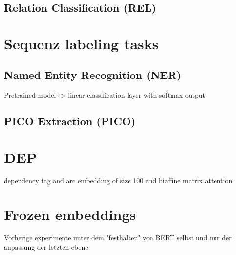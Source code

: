\subsection{Relation Classification (REL)}

\section{Sequenz labeling tasks}
\subsection{Named Entity Recognition (NER)}
\color{ForestGreen}
Pretrained model -> linear classification layer with softmax output
\color{black}
\subsection{PICO Extraction (PICO)}

\color{ForestGreen}
\section{DEP}
dependency  tag and arc embedding of size 100 and biaffine matrix attention 
\section{Frozen embeddings}
Vorherige experimente unter dem "festhalten" von BERT selbst und nur der anpassung der letzten ebene
\color{black}

